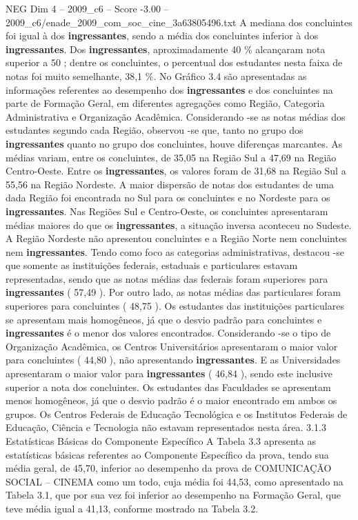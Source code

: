\begin{textsample}{NEG Dim 4 – 2009\_c6 – Score -3.00 – 2009\_c6/enade\_2009\_com\_soc\_cine\_3a63805496.txt}
A mediana dos concluintes foi igual à dos \textbf{ingressantes}, sendo a média dos concluintes inferior à dos \textbf{ingressantes}.
Dos \textbf{ingressantes}, aproximadamente 40 \% alcançaram nota superior a 50 ; dentre os concluintes, o percentual dos estudantes nesta faixa de notas foi muito semelhante, 38,1 \%.
No Gráfico 3.4 são apresentadas as informações referentes ao desempenho dos \textbf{ingressantes} e dos concluintes na parte de Formação Geral, em diferentes agregações como Região, Categoria Administrativa e Organização Acadêmica.
Considerando -se as notas médias dos estudantes segundo cada Região, observou -se que, tanto no grupo dos \textbf{ingressantes} quanto no grupo dos concluintes, houve diferenças marcantes.
As médias variam, entre os concluintes, de 35,05 na Região Sul a 47,69 na Região Centro-Oeste.
Entre os \textbf{ingressantes}, os valores foram de 31,68 na Região Sul a 55,56 na Região Nordeste.
A maior dispersão de notas dos estudantes de uma dada Região foi encontrada no Sul para os concluintes e no Nordeste para os \textbf{ingressantes}.
Nas Regiões Sul e Centro-Oeste, os concluintes apresentaram médias maiores do que os \textbf{ingressantes}, a situação inversa aconteceu no Sudeste.
A Região Nordeste não apresentou concluintes e a Região Norte nem concluintes nem \textbf{ingressantes}.
Tendo como foco as categorias administrativas, destacou -se que somente as instituições federais, estaduais e particulares estavam representadas, sendo que as notas médias das federais foram superiores para \textbf{ingressantes} ( 57,49 ).
Por outro lado, as notas médias das particulares foram superiores para concluintes ( 48,75 ).
Os estudantes das instituições particulares se apresentam mais homogêneos, já que o desvio padrão para concluintes e \textbf{ingressantes} é o menor dos valores encontrados.
Considerando -se o tipo de Organização Acadêmica, os Centros Universitários apresentaram o maior valor para concluintes ( 44,80 ), não apresentando \textbf{ingressantes}.
E as Universidades apresentaram o maior valor para \textbf{ingressantes} ( 46,84 ), sendo este inclusive superior a nota dos concluintes.
Os estudantes das Faculdades se apresentam menos homogêneos, já que o desvio padrão é o maior encontrado em ambos os grupos.
Os Centros Federais de Educação Tecnológica e os Institutos Federais de Educação, Ciência e Tecnologia não estavam representados nesta área. 3.1.3 Estatísticas Básicas do Componente Específico A Tabela 3.3 apresenta as estatísticas básicas referentes ao Componente Específico da prova, tendo sua média geral, de 45,70, inferior ao desempenho da prova de COMUNICAÇÃO SOCIAL – CINEMA como um todo, cuja média foi 44,53, como apresentado na Tabela 3.1, que por sua vez foi inferior ao desempenho na Formação Geral, que teve média igual a 41,13, conforme mostrado na Tabela 3.2.

\end{textsample}
